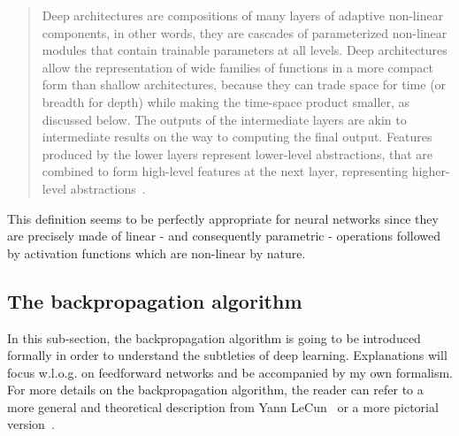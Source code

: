         \begin{quotation}
            Deep architectures are compositions of many layers of adaptive non-linear components,
            in other words, they are cascades of parameterized non-linear modules that contain
            trainable parameters at all levels. Deep architectures allow the representation of wide
            families of functions in a more compact form than shallow architectures, because they
            can trade space for time (or breadth for depth) while making the time-space product
            smaller, as discussed below. The outputs of the intermediate layers are akin to intermediate
            results on the way to computing the final output. Features produced by the lower
            layers represent lower-level abstractions, that are combined to form high-level features
            at the next layer, representing higher-level abstractions~\cite{40d5d7fd62cb44ba934a8a75d4b2b076}.
        \end{quotation}

        This definition seems to be perfectly appropriate for neural networks since they are precisely
        made of linear - and consequently parametric - operations followed by activation functions which
        are non-linear by nature.

    \subsection{The backpropagation algorithm} \label{backpropagation}

        In this sub-section, the backpropagation algorithm is going to be introduced formally in order
        to understand the subtleties of deep learning. Explanations will focus w.l.o.g. on feedforward networks
        and be accompanied by my own formalism. For more details on the backpropagation algorithm,
        the reader can refer to a more general and theoretical description from Yann LeCun~\cite{lecun1988theoretical}
        or a more pictorial version~\cite{lecun2015deep}.

